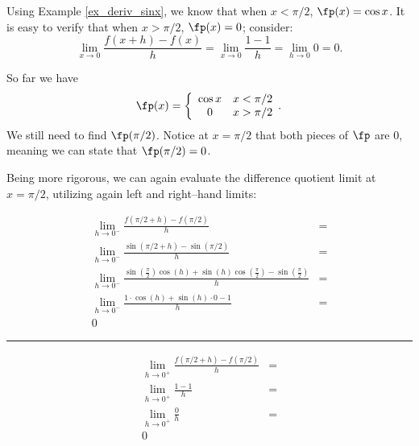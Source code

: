 {Using Example \ref{ex_deriv_sinx}, we know that when $x<\pi/2$, $\fp(x) = \cos x$. It is easy to verify that when $x>\pi/2$, $\fp(x) = 0$; consider:
			\[
			\lim_{x\to0}\frac{f(x+h) - f(x)}{h} = \lim_{x\to0}\frac{1-1}{h} = \lim_{h\to0}0 =0.
			\]
			
So far we have 
\[
\fp(x) = \left\{\begin{array}{cc} \cos x & x<\pi/2\\ 0 & x>\pi/2\end{array}.\right.
\]
 We still need to find $\fp(\pi/2)$. Notice at $x=\pi/2$ that both pieces of $\fp$ are 0, meaning we can state that $\fp(\pi/2)=0$. 

Being more rigorous, we can again evaluate the difference quotient limit at $x=\pi/2$, utilizing again left and right--hand limits:\\

\small
\noindent\begin{minipage}{.6\linewidth}
\begin{align*}
\lim_{h\to0^-}\frac{f(\pi/2+h)-f(\pi/2)}{h} &=\\
\lim_{h\to0^-}\frac{\sin(\pi/2+h)-\sin(\pi/2)}{h}&=\\
\lim_{h\to0^-}{ \frac{\sin(\frac{\pi}{2})\cos(h)+\sin(h)\cos(\frac{\pi}{2})-\sin(\frac{\pi}{2})}{h}}&=\\
\lim_{h\to0^-}\frac{1\cdot\cos(h)+\sin(h)\cdot 0-1}{h} &=\\
0
\end{align*}
\end{minipage}
\begin{minipage}{1pt}
 \rule{.5pt}{100pt}
\end{minipage}
\begin{minipage}{.4\linewidth}
\begin{align*}
\lim_{h\to0^+}\frac{f(\pi/2+h)-f(\pi/2)}{h} &=\\
\lim_{h\to0^+}\frac{1-1}{h}&=\\
\lim_{h\to0^+}\frac{0}{h}&=\\
0&\\
\phantom{0}\\
\phantom{0}
\end{align*}
\end{minipage}
\normalsize

}

